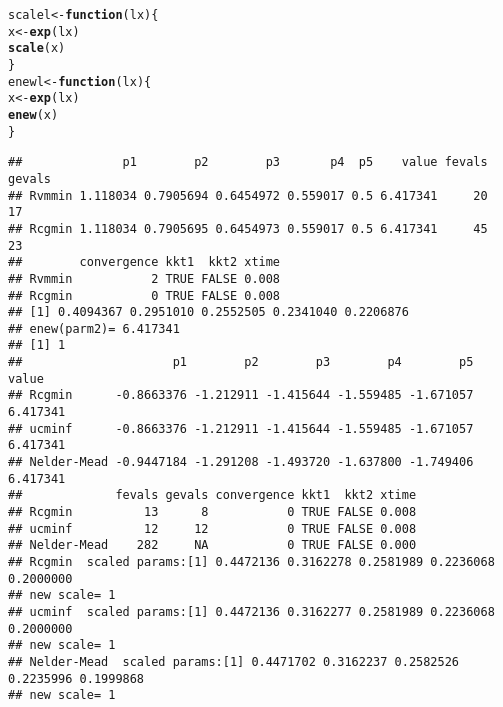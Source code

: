 \documentclass[11pt]{article}\usepackage[]{graphicx}\usepackage[]{color}
\makeatletter
\newcommand{\hlstd}[1]{\textcolor[rgb]{0.345,0.345,0.345}{#1}}%
\newcommand{\hlkwa}[1]{\textcolor[rgb]{0.161,0.373,0.58}{\textbf{#1}}}%
\newcommand{\hlkwb}[1]{\textcolor[rgb]{0.69,0.353,0.396}{#1}}%
\newcommand{\hlkwc}[1]{\textcolor[rgb]{0.333,0.667,0.333}{#1}}%
\newcommand{\hlkwd}[1]{\textcolor[rgb]{0.737,0.353,0.396}{\textbf{#1}}}%
\newenvironment{kframe}{%
 \def\at@end@of@kframe{}%
 \ifinner\ifhmode%
  \def\at@end@of@kframe{\end{minipage}}%
  \begin{minipage}{\columnwidth}%
 \fi\fi%
 \def\FrameCommand##1{\hskip\@totalleftmargin \hskip-\fboxsep
 \colorbox{shadecolor}{##1}\hskip-\fboxsep
     \hskip-\linewidth \hskip-\@totalleftmargin \hskip\columnwidth}%
 \MakeFramed {\advance\hsize-\width
   \@totalleftmargin\z@ \linewidth\hsize
   \@setminipage}}%
 {\par\unskip\endMakeFramed%
 \at@end@of@kframe}
\newenvironment{knitrout}{}{} %
\makeatother
\begin{document}
\begin{knitrout}\scriptsize
{}\color{fgcolor}\begin{kframe}
\begin{alltt}
\hlstd{scalel} \hlkwb{<-} \hlkwa{function}\hlstd{(}\hlkwc{lx}\hlstd{)\{}
  \hlstd{x}\hlkwb{<-}\hlkwd{exp}\hlstd{(lx)}
  \hlkwd{scale}\hlstd{(x)}
\hlstd{\}}
\hlstd{enewl} \hlkwb{<-} \hlkwa{function}\hlstd{(}\hlkwc{lx}\hlstd{)\{}
  \hlstd{x}\hlkwb{<-}\hlkwd{exp}\hlstd{(lx)}
  \hlkwd{enew}\hlstd{(x)}
\hlstd{\}}
\end{alltt}
\end{kframe}
\end{knitrout}

\begin{knitrout}\scriptsize
{}\color{fgcolor}\begin{kframe}


{\ttfamily\noindent\color{warningcolor}{\#\# Warning in bmchk(par, lower = lower, upper = upper): Masks (fixed parameters) set by bmchk due to tight bounds. CAUTION!!}}

{\ttfamily\noindent\color{warningcolor}{\#\# Warning in bmchk(par, lower = lower, upper = upper): Masks (fixed parameters) set by bmchk due to tight bounds. CAUTION!!}}

{\ttfamily\noindent\color{warningcolor}{\#\# Warning in bmchk(par, lower = lower, upper = upper): Masks (fixed parameters) set by bmchk due to tight bounds. CAUTION!!}}\begin{verbatim}
##              p1        p2        p3       p4  p5    value fevals gevals
## Rvmmin 1.118034 0.7905694 0.6454972 0.559017 0.5 6.417341     20     17
## Rcgmin 1.118034 0.7905695 0.6454973 0.559017 0.5 6.417341     45     23
##        convergence kkt1  kkt2 xtime
## Rvmmin           2 TRUE FALSE 0.008
## Rcgmin           0 TRUE FALSE 0.008
## [1] 0.4094367 0.2951010 0.2552505 0.2341040 0.2206876
## enew(parm2)= 6.417341
## [1] 1
##                     p1        p2        p3        p4        p5    value
## Rcgmin      -0.8663376 -1.212911 -1.415644 -1.559485 -1.671057 6.417341
## ucminf      -0.8663376 -1.212911 -1.415644 -1.559485 -1.671057 6.417341
## Nelder-Mead -0.9447184 -1.291208 -1.493720 -1.637800 -1.749406 6.417341
##             fevals gevals convergence kkt1  kkt2 xtime
## Rcgmin          13      8           0 TRUE FALSE 0.008
## ucminf          12     12           0 TRUE FALSE 0.008
## Nelder-Mead    282     NA           0 TRUE FALSE 0.000
## Rcgmin  scaled params:[1] 0.4472136 0.3162278 0.2581989 0.2236068 0.2000000
## new scale= 1 
## ucminf  scaled params:[1] 0.4472136 0.3162277 0.2581989 0.2236068 0.2000000
## new scale= 1 
## Nelder-Mead  scaled params:[1] 0.4471702 0.3162237 0.2582526 0.2235996 0.1999868
## new scale= 1
\end{verbatim}
\end{kframe}
\end{knitrout}
\end{document}
